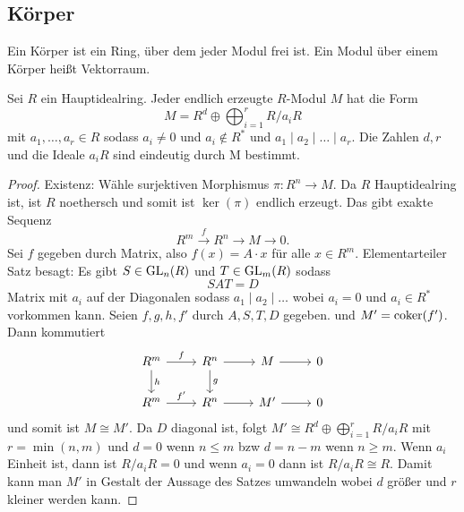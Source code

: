\subsection{Körper}
\begin{Def}
    Ein Körper ist ein Ring, über dem jeder Modul frei ist. Ein Modul über einem Körper heißt Vektorraum.
\end{Def}
\begin{Satz}\label{Satz:HauptEndlMod}
    Sei $R$ ein Hauptidealring. Jeder endlich erzeugte $R$-Modul $M$ hat die Form
    $$M=R^d\oplus\bigoplus_{i=1}^rR/a_iR$$
    mit $a_1,\dots,a_r\in R$ sodass $a_i\neq 0$ und $a_i\not\in R^*$ und $a_1\mid a_2\mid\dots\mid a_r$. Die Zahlen $d,r$ und die Ideale $a_iR$ sind eindeutig durch M bestimmt.
\end{Satz}
\begin{proof}
    Existenz: Wähle surjektiven Morphismus $\pi\colon R^n\to M$. Da $R$ Hauptidealring ist, ist $R$ noethersch und somit ist $\ker(\pi)$ endlich erzeugt. 
    Das gibt exakte Sequenz 
    $$R^m\stackrel{f}{\to} R^n\to M\to 0.$$
    Sei $f$ gegeben durch Matrix, also $f(x)=A\cdot x$ für alle $x\in R^m$.
    Elementarteiler Satz besagt:
    Es gibt $S\in\operatorname{GL}_n(R)$ und $T\in \operatorname{GL}_m(R)$ sodass 
    $$SAT=D$$ Matrix mit $a_i$ auf der Diagonalen sodass $a_1\mid a_2\mid\dots$ wobei $a_i=0$ und $a_i\in R^*$ vorkommen kann. Seien $f,g,h,f'$ durch $A,S,T,D$ gegeben. und $M'=\operatorname{coker}(f')$. Dann kommutiert %
$$\begin{tikzcd}
R^m \arrow[r, "f"] \arrow[d, "h"] & R^n \arrow[r] \arrow[d, "g"] & M \arrow[r]  & 0 \\
R^m \arrow[r, "f'"]               & R^n \arrow[r]                & M' \arrow[r] & 0
\end{tikzcd}$$ und somit ist $M\cong M'$.
Da $D$ diagonal ist, folgt $M'\cong R^d\oplus\bigoplus_{i=1}^rR/a_iR$ mit $r=\min(n,m)$ und $d=0$ wenn $n\leq m$ bzw $d=n-m$ wenn $n\geq m$. Wenn $a_i$ Einheit ist, dann ist $R/a_iR=0$ und wenn $a_i=0$ dann ist $R/a_iR\cong R$. Damit kann man $M'$ in Gestalt der Aussage des Satzes umwandeln wobei $d$ größer und $r$ kleiner werden kann.
\end{proof}